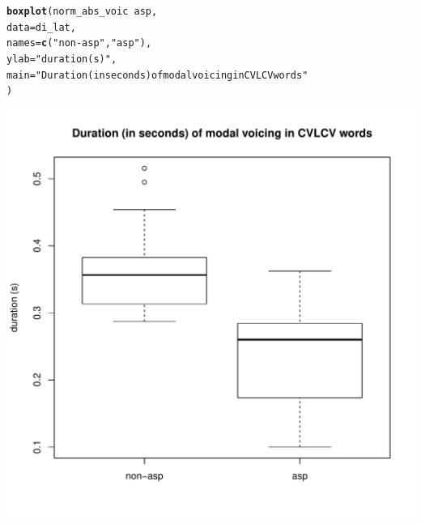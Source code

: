\documentclass[a4paper,11pt]{article}\usepackage[]{graphicx}\usepackage[]{color}
\makeatletter
\def\maxwidth{ %
  \ifdim\Gin@nat@width>\linewidth
    \linewidth
  \else
    \Gin@nat@width
  \fi
}
\newcommand{\hlstr}[1]{\textcolor[rgb]{0.192,0.494,0.8}{#1}}%
\newcommand{\hlopt}[1]{\textcolor[rgb]{0,0,0}{#1}}%
\newcommand{\hlstd}[1]{\textcolor[rgb]{0.345,0.345,0.345}{#1}}%
\newcommand{\hlkwc}[1]{\textcolor[rgb]{0.333,0.667,0.333}{#1}}%
\newcommand{\hlkwd}[1]{\textcolor[rgb]{0.737,0.353,0.396}{\textbf{#1}}}%
\newenvironment{kframe}{%
 \def\at@end@of@kframe{}%
 \ifinner\ifhmode%
  \def\at@end@of@kframe{\end{minipage}}%
  \begin{minipage}{\columnwidth}%
 \fi\fi%
 \def\FrameCommand##1{\hskip\@totalleftmargin \hskip-\fboxsep
 \colorbox{shadecolor}{##1}\hskip-\fboxsep
     \hskip-\linewidth \hskip-\@totalleftmargin \hskip\columnwidth}%
 \MakeFramed {\advance\hsize-\width
   \@totalleftmargin\z@ \linewidth\hsize
   \@setminipage}}%
 {\par\unskip\endMakeFramed%
 \at@end@of@kframe}
\newenvironment{knitrout}{}{} %
\makeatother
\begin{document}
\begin{knitrout}
\end{knitrout}

\begin{knitrout}
\color{fgcolor}\begin{kframe}
\begin{alltt}
\hlkwd{boxplot}\hlstd{(norm_abs_voic} \hlopt{~} \hlstd{asp,}
        \hlkwc{data} \hlstd{= di_lat,}
        \hlkwc{names} \hlstd{=} \hlkwd{c}\hlstd{(}\hlstr{"non-asp"}\hlstd{,} \hlstr{"asp"}\hlstd{),}
        \hlkwc{ylab} \hlstd{=} \hlstr{"duration (s)"}\hlstd{,}
        \hlkwc{main} \hlstd{=} \hlstr{"Duration (in seconds) of modal voicing in CVLCV words"}
        \hlstd{)}
\end{alltt}
\end{kframe}
\includegraphics[width=\maxwidth]{img/bi-lat-box-1} 

\end{knitrout}
\end{document}
